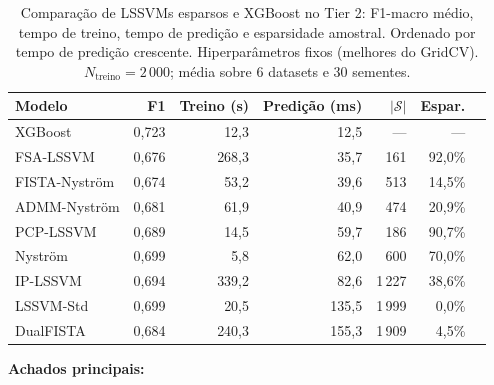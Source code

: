 \documentclass[12pt,a4paper]{article}
\begin{document}
\begin{table}[H]
\centering
\caption{Comparação de LSSVMs esparsos e XGBoost no Tier 2: F1-macro médio,
tempo de treino, tempo de predição e esparsidade amostral. Ordenado por tempo
de predição crescente. Hiperparâmetros fixos (melhores do GridCV).
$N_{\text{treino}}{=}2\,000$; média sobre 6 datasets e 30 sementes.}
\label{tab:lssvm_pred_benchmark}
\begin{tabular}{lrrrrrr}
\toprule
\textbf{Modelo} & \textbf{F1} & \textbf{Treino (s)} & \textbf{Predição (ms)} & \textbf{$|\mathcal{S}|$} & \textbf{Espar.} \\
\midrule
XGBoost          & 0,723 &  12,3 &  12,5 &    --- &   --- \\
FSA-LSSVM        & 0,676 & 268,3 &  35,7 &    161 & 92,0\% \\
FISTA-Nyström    & 0,674 &  53,2 &  39,6 &    513 & 14,5\% \\
ADMM-Nyström     & 0,681 &  61,9 &  40,9 &    474 & 20,9\% \\
PCP-LSSVM        & 0,689 &  14,5 &  59,7 &    186 & 90,7\% \\
Nyström          & 0,699 &   5,8 &  62,0 &    600 & 70,0\% \\
IP-LSSVM         & 0,694 & 339,2 &  82,6 &  1\,227 & 38,6\% \\
LSSVM-Std        & 0,699 &  20,5 & 135,5 &  1\,999 &  0,0\% \\
DualFISTA        & 0,684 & 240,3 & 155,3 &  1\,909 &  4,5\% \\
\bottomrule
\end{tabular}
\end{table}

\textbf{Achados principais:}
\end{document}
